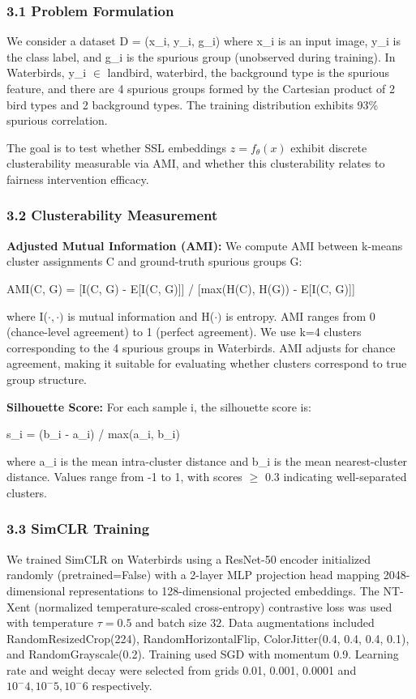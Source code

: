 
\subsubsection{3.1 Problem Formulation}

We consider a dataset D = {(x\_i, y\_i, g\_i)} where x\_i is an input image, y\_i is the class label, and g\_i is the spurious group (unobserved during training). In Waterbirds, y\_i $\in$ {landbird, waterbird}, the background type is the spurious feature, and there are 4 spurious groups formed by the Cartesian product of 2 bird types and 2 background types. The training distribution exhibits 93\% spurious correlation.

The goal is to test whether SSL embeddings $z = f_\theta(x)$ exhibit discrete clusterability measurable via AMI, and whether this clusterability relates to fairness intervention efficacy.

\subsubsection{3.2 Clusterability Measurement}

\textbf{Adjusted Mutual Information (AMI):} We compute AMI between k-means cluster assignments C and ground-truth spurious groups G:

AMI(C, G) = [I(C, G) - E[I(C, G)]] / [max(H(C), H(G)) - E[I(C, G)]]

where I($\cdot ,\cdot )$ is mutual information and H($\cdot )$ is entropy. AMI ranges from 0 (chance-level agreement) to 1 (perfect agreement). We use k=4 clusters corresponding to the 4 spurious groups in Waterbirds. AMI adjusts for chance agreement, making it suitable for evaluating whether clusters correspond to true group structure.

\textbf{Silhouette Score:} For each sample i, the silhouette score is:

s\_i = (b\_i - a\_i) / max(a\_i, b\_i)

where a\_i is the mean intra-cluster distance and b\_i is the mean nearest-cluster distance. Values range from -1 to 1, with scores $\geq$ 0.3 indicating well-separated clusters.

\subsubsection{3.3 SimCLR Training}

We trained SimCLR \citep{chen2020simclr} on Waterbirds using a ResNet-50 encoder initialized randomly (pretrained=False) with a 2-layer MLP projection head mapping 2048-dimensional representations to 128-dimensional projected embeddings. The NT-Xent (normalized temperature-scaled cross-entropy) contrastive loss was used with temperature $\tau =0.5$ and batch size 32. Data augmentations included RandomResizedCrop(224), RandomHorizontalFlip, ColorJitter(0.4, 0.4, 0.4, 0.1), and RandomGrayscale(0.2). Training used SGD with momentum 0.9. Learning rate and weight decay were selected from grids {0.01, 0.001, 0.0001} and {$10^-4, 10^-5, 10^-6$} respectively.

